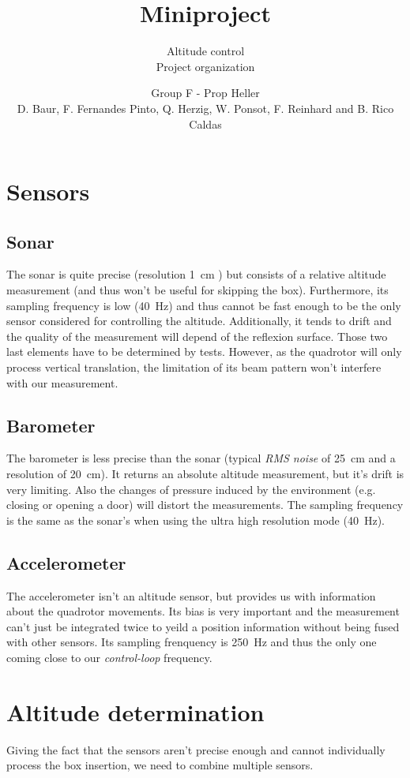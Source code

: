 \documentclass{repMobRob}
\author{Group F - Prop Heller \\ D. Baur, F. Fernandes Pinto, Q. Herzig, W. Ponsot, F. Reinhard and B. Rico Caldas}
\title{Miniproject}
\subtitle{Altitude control \\ \small{Project organization}}
\begin{document}
\thispagestyle{empty}
\maketitle

\section{Sensors}
\subsection{Sonar}
The sonar is quite precise (resolution \SI{1}{\centi\meter} ) but consists of a relative altitude measurement (and thus won’t be useful for skipping the box). Furthermore, its sampling frequency is low (\SI{40}{\hertz}) and thus cannot be fast enough to be the only sensor considered for controlling the altitude. Additionally, it tends to drift and the quality of the measurement will depend of the reflexion surface. Those two last elements have to be determined by tests. However, as the quadrotor will only process vertical translation, the limitation of its beam pattern won’t interfere with our measurement.

\subsection{Barometer}
The barometer is less precise than the sonar (typical \emph{RMS noise} of \SI{25}{\centi\meter} and a resolution of \SI{20}{\centi\meter}).
It returns an absolute altitude measurement, but it's drift is very limiting.
Also the changes of pressure induced by the environment (e.g. closing or opening a door) will distort the measurements.
The sampling frequency is the same as the sonar's when using the ultra high resolution mode (\SI{40}{\hertz}).

\subsection{Accelerometer}
The accelerometer isn't an altitude sensor, but provides us with information about the quadrotor movements.
Its bias is very important and the measurement can't just be integrated twice to yeild a position information without being fused with other sensors.
Its sampling frenquency is \SI{250}{\hertz} and thus the only one coming close to our \emph{control-loop} frequency. 

\section{Altitude determination}
Giving the fact that the sensors aren’t precise enough and cannot individually process the box insertion, we need to combine multiple sensors. 
\end{document}
